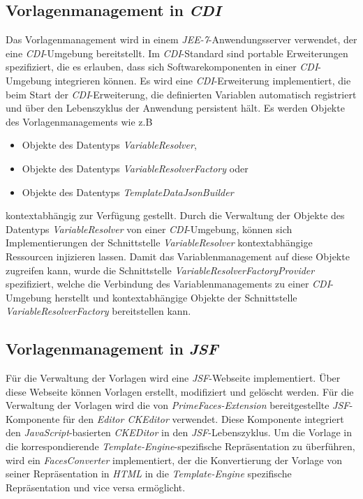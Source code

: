 \subsection{Vorlagenmanagement in \emph{CDI}}
\label{sec:sub-template-management-cdi}
Das Vorlagenmanagement wird in einem \emph{JEE-7}-Anwendungsserver verwendet, der eine \emph{CDI}-Umgebung bereitstellt. Im \emph{CDI}-Standard sind portable Erweiterungen  spezifiziert, die es erlauben, dass sich Softwarekomponenten in einer \emph{CDI}-Umgebung integrieren können. Es wird eine \emph{CDI}-Erweiterung implementiert, die beim Start der \emph{CDI}-Erweiterung, die definierten Variablen automatisch registriert und über den Lebenszyklus der Anwendung persistent hält. Es werden Objekte des Vorlagenmanagements wie z.B
\begin{itemize}
	\item Objekte des Datentyps \emph{VariableResolver},
	\item Objekte des Datentyps \emph{VariableResolverFactory} oder
	\item Objekte des Datentyps \emph{TemplateDataJsonBuilder}
\end{itemize}
kontextabhängig zur Verfügung gestellt.
\newline
Durch die Verwaltung der Objekte des Datentyps \emph{VariableResolver} von einer \emph{CDI}-Umgebung, können sich Implementierungen der Schnittstelle \emph{VariableResolver} kontextabhängige Ressourcen injizieren lassen. Damit das Variablenmanagement auf diese Objekte zugreifen kann, wurde die Schnittstelle \emph{VariableResolverFactoryProvider} spezifiziert, welche die Verbindung des Variablenmanagements zu einer \emph{CDI}-Umgebung herstellt und kontextabhängige Objekte der Schnittstelle \emph{VariableResolverFactory} bereitstellen kann.

\subsection{Vorlagenmanagement in \emph{JSF}}
\label{sec-sub-specification-jsf}
Für die Verwaltung der Vorlagen wird eine \emph{JSF}-Webseite implementiert. Über diese Webseite können Vorlagen erstellt, modifiziert und gelöscht werden. 
\newline
\newline
Für die Verwaltung der Vorlagen wird die von \emph{PrimeFaces-Extension} bereitgestellte \emph{JSF}-Komponente für den \emph{Editor CKEditor} verwendet. Diese Komponente integriert den \emph{JavaScript}-basierten \emph{CKEDitor} in den \emph{JSF}-Lebenszyklus. 
\newline
\newline
Um die Vorlage in die korrespondierende \emph{Template-Engine}-spezifische Repräsentation zu überführen, wird ein \emph{FacesConverter} implementiert, der die Konvertierung der Vorlage von seiner Repräsentation in \emph{HTML} in die \emph{Template-Engine} spezifische Repräsentation und vice versa ermöglicht.

